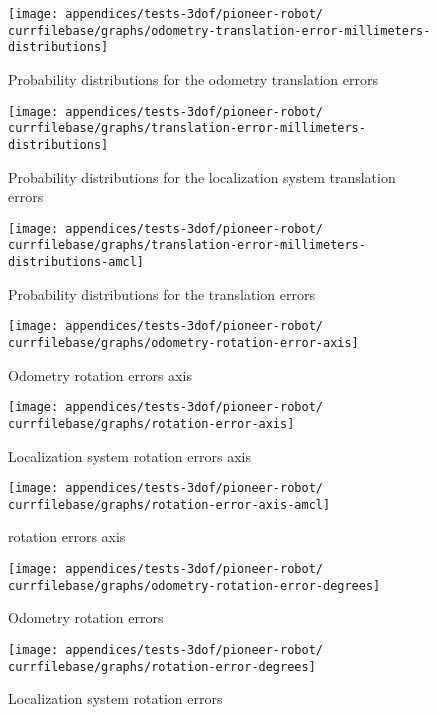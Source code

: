 \begin{figure}[H]
	\centering
	\texttt{[image: appendices/tests-3dof/pioneer-robot/\\currfilebase/graphs/odometry-translation-error-millimeters-distributions]}
	\caption{Probability distributions for the odometry translation errors}
\end{figure}

\begin{figure}[H]
	\centering
	\texttt{[image: appendices/tests-3dof/pioneer-robot/\\currfilebase/graphs/translation-error-millimeters-distributions]}
	\caption{Probability distributions for the localization system translation errors}
\end{figure}

\begin{figure}[H]
	\centering
	\texttt{[image: appendices/tests-3dof/pioneer-robot/\\currfilebase/graphs/translation-error-millimeters-distributions-amcl]}
	\caption{Probability distributions for the  translation errors}
\end{figure}


\begin{figure}[H]
	\centering
	\texttt{[image: appendices/tests-3dof/pioneer-robot/\\currfilebase/graphs/odometry-rotation-error-axis]}
	\caption{Odometry rotation errors axis}
\end{figure}

\begin{figure}[H]
	\centering
	\texttt{[image: appendices/tests-3dof/pioneer-robot/\\currfilebase/graphs/rotation-error-axis]}
	\caption{Localization system rotation errors axis}
\end{figure}

\begin{figure}[H]
	\centering
	\texttt{[image: appendices/tests-3dof/pioneer-robot/\\currfilebase/graphs/rotation-error-axis-amcl]}
	\caption{ rotation errors axis}
\end{figure}


\begin{figure}[H]
	\centering
	\texttt{[image: appendices/tests-3dof/pioneer-robot/\\currfilebase/graphs/odometry-rotation-error-degrees]}
	\caption{Odometry rotation errors}
\end{figure}

\begin{figure}[H]
	\centering
	\texttt{[image: appendices/tests-3dof/pioneer-robot/\\currfilebase/graphs/rotation-error-degrees]}
	\caption{Localization system rotation errors}
\end{figure}

